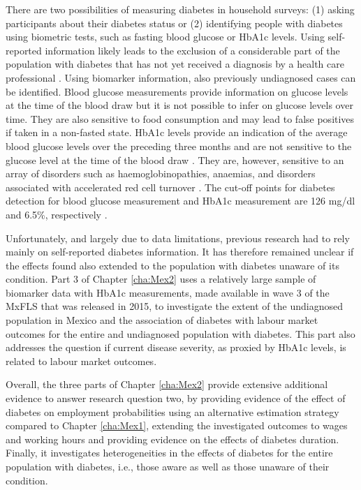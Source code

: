 There are two possibilities of measuring diabetes in household surveys: (1) asking participants about their diabetes status or (2) identifying people with diabetes using biometric tests, such as fasting blood glucose or \ac{HbA1c} levels. Using self-reported information likely leads to the exclusion of a considerable part of the population with diabetes that has not yet received a diagnosis by a health care professional \parencite{Beagley2014}. Using biomarker information, also previously undiagnosed cases can be identified. Blood glucose measurements provide information on glucose levels at the time of the blood draw but it is not possible to infer on glucose levels over time. They are also sensitive to food consumption and may lead to false positives if taken in a non-fasted state. \ac{HbA1c} levels provide an indication of the average blood glucose levels over the preceding three months and are not sensitive to the glucose level at the time of the blood draw \parencite{WorldHealthOrganization2011}. They are, however, sensitive to an array of disorders such as haemoglobinopathies, anaemias, and disorders associated with accelerated red cell turnover \parencite{WorldHealthOrganization2011}. The cut-off points for diabetes detection for blood glucose measurement and \ac{HbA1c} measurement are 126 mg/dl and 6.5\%, respectively \parencite{WorldHealthOrganization2006,WorldHealthOrganization2011}.

Unfortunately, and largely due to data limitations, previous research had to rely mainly on self-reported diabetes information. It has therefore remained unclear if the effects found also extended to the population with diabetes unaware of its condition. Part 3 of Chapter \ref{cha:Mex2} uses a relatively large sample of biomarker data with \ac{HbA1c} measurements, made available in wave 3 of the \ac{MxFLS} that was released in 2015, to investigate the extent of the undiagnosed population in Mexico and the association of diabetes with labour market outcomes for the entire and undiagnosed population with diabetes. This part also addresses the question if current disease severity, as proxied by \ac{HbA1c} levels, is related to labour market outcomes. 

Overall, the three parts of Chapter \ref{cha:Mex2} provide extensive additional evidence to answer research question two, by providing evidence of the effect of diabetes on employment probabilities using an alternative estimation strategy compared to Chapter \ref{cha:Mex1}, extending the investigated outcomes to wages and working hours and providing evidence on the effects of diabetes duration. Finally, it investigates heterogeneities in the effects of diabetes for the entire population with diabetes, i.e., those aware as well as those unaware of their condition.

